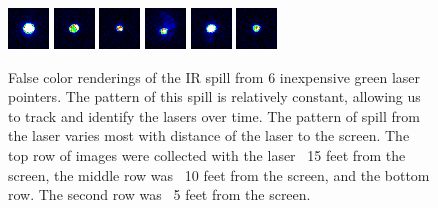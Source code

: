 \documentclass[review]{vgtc}                 %
\begin{document}
\begin{figure}
\includegraphics[width=0.16\linewidth]{images/SpotPPMs/tagged_2_frame_599_point_FC_0.png}
\includegraphics[width=0.16\linewidth]{images/SpotPPMs/tagged_5_frame_838_point_FC_0.png}
\includegraphics[width=0.16\linewidth]{images/SpotPPMs/tagged_8_frame_1085_point_FC_0.png}
\includegraphics[width=0.16\linewidth]{images/SpotPPMs/tagged_11_frame_1328_point_FC_0.png}
\includegraphics[width=0.16\linewidth]{images/SpotPPMs/tagged_14_frame_1594_point_FC_0.png}
\includegraphics[width=0.16\linewidth]{images/SpotPPMs/tagged_17_frame_1819_point_FC_0.png}

\vspace{-0.1in}
  \caption{\label{figure:laser_dots} 
False color renderings of the IR spill from 6 inexpensive green laser
pointers.  The pattern of this spill is relatively constant, allowing
us to track and identify the lasers over time.  The pattern of spill
from the laser varies most with distance of the laser to the screen.
The top row of images were collected with the laser ~15 feet from the
screen, the middle row was ~10 feet from the screen, and the bottom
row.  The second row was ~5 feet from the screen.
}
\end{figure}
\end{document}
